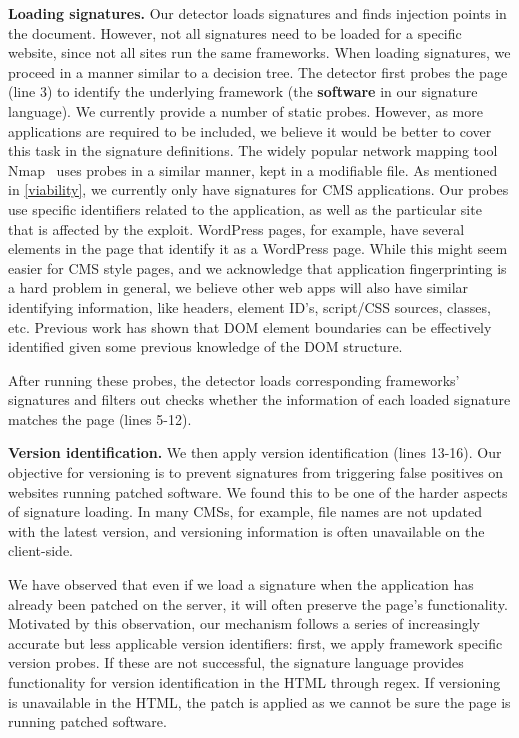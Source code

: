 \textbf{Loading signatures.}
Our detector loads signatures and finds injection points in the document. However, not all signatures need to be loaded for a specific website, since not all sites run the same frameworks. When loading signatures, we proceed in a manner similar to a decision tree. The detector first probes the page (line 3) to identify the underlying framework (the \textbf{software} in our signature language). We currently provide a number of static probes. However, as more applications are required to be included, we believe it would be better to cover this task in the signature definitions. The widely popular network mapping tool Nmap~\cite{nMap} uses probes in a similar manner, kept in a modifiable file. As mentioned in \autoref{viability}, we currently only have signatures for CMS applications. Our probes use specific identifiers related to the application, as well as the particular site that is affected by the exploit. WordPress pages, for example, have several elements in the page that identify it as a WordPress page. While this might seem easier for CMS style pages, and we acknowledge that application fingerprinting is a hard problem in general, we believe other web apps will also have similar identifying information, like headers, element ID's, script/CSS sources, classes, etc. Previous work has shown that DOM element boundaries can be effectively identified given some previous knowledge of the DOM structure.

After running these probes, the detector loads corresponding frameworks' signatures and filters out checks whether the information of each loaded signature matches the page (lines 5-12).

\textbf{Version identification.} We then apply version identification
(lines 13-16). Our objective for versioning is to prevent signatures from
triggering false positives on websites running patched software. We
found this to be one of the harder aspects of signature loading. In
many \acp{CMS}, for example, file names are not updated with the
latest version, and versioning information is often unavailable on the client-side.

We have observed that even if we load a signature when the
application has already been patched on the server, it will often
preserve the page's functionality. Motivated by this observation, our mechanism
follows a series of increasingly accurate but less applicable version
identifiers: first, we apply framework specific version probes. If
these are not successful, the signature language provides
functionality for version identification in the HTML through regex. If
versioning is unavailable in the HTML, the patch is applied
as we cannot be sure the page is running patched
software. %

